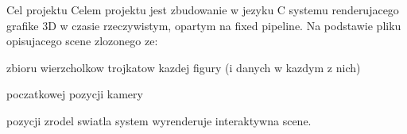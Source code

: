 \begin{DoxyParagraph}{Cel projektu}
Celem projektu jest zbudowanie w jezyku C systemu renderujacego grafike 3\-D w czasie rzeczywistym, opartym na fixed pipeline. Na podstawie pliku opisujacego scene zlozonego ze\-:
\begin{DoxyItemize}
\item zbioru wierzcholkow trojkatow kazdej figury (i danych w kazdym z nich)
\item poczatkowej pozycji kamery
\item pozycji zrodel swiatla system wyrenderuje interaktywna scene. 
\end{DoxyItemize}
\end{DoxyParagraph}
